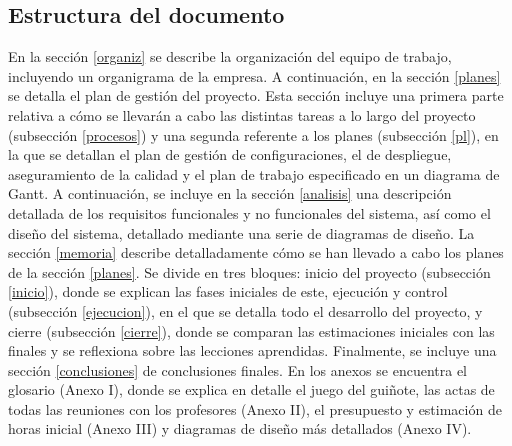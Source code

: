 \documentclass[]{article}
\begin{document}
\clearpage

\subsection{Estructura del documento}
En la sección \ref{organiz} se describe la organización del equipo de trabajo, incluyendo un organigrama de la empresa. A continuación, en la sección \ref{planes} se detalla el plan de gestión del proyecto. Esta sección incluye una primera parte relativa a cómo se llevarán a cabo las distintas tareas a lo largo del proyecto (subsección \ref{procesos}) y una segunda referente a los planes (subsección \ref{pl}), en la que se detallan el plan de gestión de configuraciones, el de despliegue, aseguramiento de la calidad y el plan de trabajo especificado en un diagrama de Gantt. A continuación, se incluye en la sección \ref{analisis} una descripción detallada de los requisitos funcionales y no funcionales del sistema, así como el diseño del sistema, detallado mediante una serie de diagramas de diseño. La sección \ref{memoria} describe detalladamente cómo se han llevado a cabo los planes de la sección \ref{planes}. Se divide en tres bloques: inicio del proyecto (subsección \ref{inicio}), donde se explican las fases iniciales de este, ejecución y control (subsección \ref{ejecucion}), en el que se detalla todo el desarrollo del proyecto, y cierre (subsección \ref{cierre}), donde se comparan las estimaciones iniciales con las finales y se reflexiona sobre las lecciones aprendidas. Finalmente, se incluye una sección \ref{conclusiones} de conclusiones finales. En los anexos se encuentra el glosario (Anexo I), donde se explica en detalle el juego del guiñote, las actas de todas las reuniones con los profesores (Anexo II), el presupuesto y estimación de horas inicial (Anexo III) y diagramas de diseño más detallados (Anexo IV).

\clearpage

\clearpage

\clearpage

\clearpage

\clearpage


\clearpage
\end{document}
